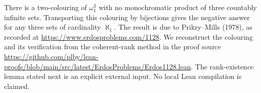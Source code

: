 There is a two-colouring of \(\omega_1^3\) with no monochromatic product of three countably infinite sets. Transporting this colouring by bijections gives the negative answer for any three sets of cardinality \(\aleph_1\).
The result is due to Prikry--Mills (1978), as recorded at \url{https://www.erdosproblems.com/1128}.
We reconstruct the colouring and its verification from the coherent-rank method in the proof source
\url{https://github.com/plby/lean-proofs/blob/main/src/latest/ErdosProblems/Erdos1128.lean}.
The rank-existence lemma stated next is an explicit external input. No local Lean compilation is claimed.
